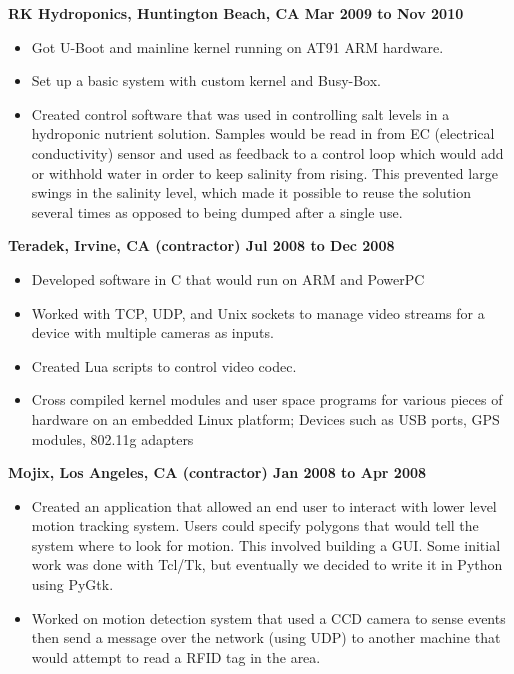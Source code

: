 \documentclass{res}
\begin{document}
\begin{resume}
{\large \bf RK Hydroponics, Huntington Beach, CA \hfill Mar 2009 to Nov 2010}
\begin{itemize}
\item Got U-Boot and mainline kernel running on AT91 ARM hardware.
\item Set up a basic system with custom kernel and Busy-Box.
\item Created control software that was used in controlling salt levels
in a hydroponic nutrient solution.  Samples would be read in from
EC (electrical conductivity) sensor and used as feedback to a control
loop which would add or withhold water in order to keep salinity from rising.
This prevented large swings in the salinity level, which made it possible
to reuse the solution several times as opposed to being dumped after a 
single use.
\end{itemize}

{\large \bf Teradek, Irvine, CA (contractor) \hfill Jul 2008 to Dec 2008}
\begin{itemize}
\item Developed software in C that would run on ARM and PowerPC
\item Worked with TCP, UDP, and Unix sockets to manage video streams for
a device with multiple cameras as inputs.
\item Created Lua scripts to control video codec.
\item Cross compiled kernel modules and user space programs for various
pieces of hardware on an embedded Linux platform; Devices such as USB
ports, GPS modules, 802.11g adapters
\end{itemize}

{\large \bf Mojix, Los Angeles, CA (contractor) \hfill Jan 2008 to Apr 2008}
\begin{itemize}

\item Created an application that allowed an end user to interact
with lower level motion tracking system.  Users could specify polygons
that would tell the system where to look for motion.  This involved
building a GUI.  Some initial work was done with Tcl/Tk, but eventually
we decided to write it in Python using PyGtk.

\item Worked on motion detection system that used a CCD camera to sense
events then send a message over the network (using UDP) to another
machine that would attempt to read a RFID tag in the area.

\end{itemize}


\end{resume}
\end{document}
